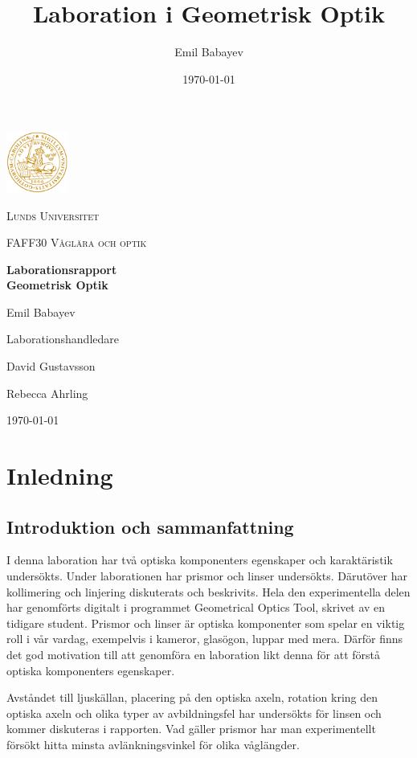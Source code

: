 \documentclass[a4paper]{article}
\title{Laboration i Geometrisk Optik}
\author{Emil Babayev}
\date{\today}
\begin{document}
\begin{titlepage}
	\centering
	\includegraphics[width=0.15\textwidth]{logo.png}\par\vspace{1cm}
	{\scshape\large Lunds Universitet \par}
	\vspace{1cm}
    {\scshape\large FAFF30 Våglära och optik\par}
	\vspace{1.5cm}
	{\huge\bfseries Laborationsrapport\\Geometrisk Optik\par}
	\vspace{2cm}
	{\Large Emil Babayev\par}
	\vfill
	Laborationshandledare\par
    David Gustavsson \par
    Rebecca Ahrling

    \vfill
    
	{\large \today \par}
\end{titlepage}

\section{Inledning}
\subsection{Introduktion och sammanfattning}
I denna laboration har två optiska komponenters egenskaper och karaktäristik undersökts. Under laborationen har prismor
och linser undersökts. Därutöver har kollimering och linjering diskuterats och beskrivits. Hela den experimentella delen har genomförts
digitalt i programmet Geometrical Optics Tool, skrivet av en tidigare student. Prismor och linser är optiska komponenter
som spelar en viktig roll i vår vardag, exempelvis i kameror, glasögon, luppar med mera. Därför finns det god motivation 
till att genomföra en laboration likt denna för att förstå optiska komponenters egenskaper.

Avståndet till ljuskällan, placering på den optiska axeln, rotation kring den optiska axeln och olika typer av avbildningsfel
har undersökts för linsen och kommer diskuteras i rapporten. Vad gäller prismor har man experimentellt försökt hitta minsta avlänkningsvinkel
för olika våglängder.
\end{document}
